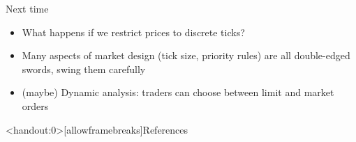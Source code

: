 \documentclass[english,10pt
,aspectratio=169
]{beamer}
\begin{document}
\begin{frame}{Next time}
	\begin{itemize}
		\item What happens if we restrict prices to discrete ticks?
		\item Many aspects of market design (tick size, priority rules) are all double-edged swords, swing them carefully
		\item (maybe) Dynamic analysis: traders can choose between limit and market orders
	\end{itemize}
\end{frame}







\appendix
\begin{frame}<handout:0>[allowframebreaks]{References}
	
	
\end{frame}
\end{document}
